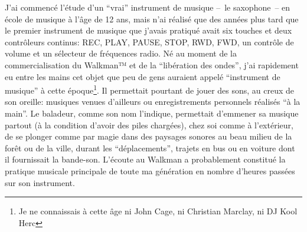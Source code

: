 \noindent J'ai commencé l'étude d'un ``vrai'' instrument de musique --~le saxophone~-- en école de musique à l'âge de 12 ans, mais n'ai réalisé que des années plus tard que le premier instrument de musique que j'avais pratiqué avait six touches et deux contrôleurs continus: REC, PLAY, PAUSE, STOP, RWD, FWD, un contrôle de volume et un sélecteur de fréquences radio. Né au moment de la commercialisation du Walkman™ et de la ``libération des ondes'', j'ai rapidement eu entre les mains cet objet que peu de gens auraient appelé ``instrument de musique'' à cette époque\footnote{Je ne connaissais à cette âge ni John Cage, ni Christian Marclay, ni DJ Kool Herc}. Il permettait pourtant de jouer des sons, au creux de son oreille: musiques venues d'ailleurs ou enregistrements personnels réalisés ``à la main''. Le baladeur, comme son nom l'indique, permettait d'emmener sa musique partout (à la condition d'avoir des piles chargées), chez soi comme à l'extérieur, de se plonger comme par magie dans des paysages sonores au beau milieu de la forêt ou de la ville, durant les ``déplacements'', trajets en bus ou en voiture dont il fournissait la bande-son. L'écoute au Walkman a probablement constitué la pratique musicale principale de toute ma génération en nombre d'heures passées sur son instrument.

